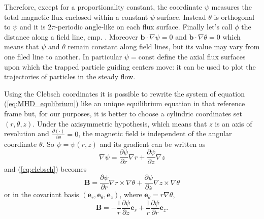 Therefore, except for a proportionality constant, the coordinate $\psi$ measures the total magnetic flux enclosed within a constant $\psi$ surface. Instead $\theta$ is orthogonal to $\psi$ and it is $2\pi$-periodic angle-like on each flux surface. Finally let's call $\phi$ the distance along a field line, cmp. \cite[p. 1617]{magnetic_mirror}. Moreover $\mathbf{b}\cdot\nabla\psi=0$ and $\mathbf{b}\cdot\nabla\theta=0$ which means that $\psi$ and $\theta$ remain constant along field lines, but its value may vary from one filed line to another. In particular $\psi=\mathrm{const}$ define the axial flux surfaces upon which the trapped particle guiding centers move: it can be used to plot the trajectories of particles in the steady flow.
\medskip

Using the Clebsch coordinates it is possible to rewrite the system of equation (\ref{eq:MHD_equlibrium}) like an unique equilibrium equation in that reference frame but, for our purposes, it is better to choose a cylindric coordinates set $(r,\theta, z)$. Under the axisymmetric hypothesis, which means that $z$ is an axis of revolution and $\frac{\partial(\cdot)}{\partial \theta}=0$, the magnetic field is independent of the angular coordinate $\theta$. So $\psi=\psi(r,z)$ and its gradient can be written as
\begin{equation}
  \nabla\psi=\frac{\partial\psi}{\partial r}\nabla r+\frac{\partial\psi}{\partial z}\nabla z
\end{equation}
and (\ref{eq:clebsch}) becomes
\begin{equation}
  \mathbf{B}= \frac{\partial\psi}{\partial r}\nabla r \times\nabla\theta+\frac{\partial\psi}{\partial z}\nabla z \times\nabla\theta
\end{equation}
or in the covariant basis $(\mathbf{e}_r,\mathbf{e}_\theta,\mathbf{e}_z)$, where $\mathbf{e}_\theta=r\nabla\theta$,
\begin{equation}\label{eq:covariantB}
 \mathbf{B}=-\frac{1}{r}\frac{\partial\psi}{\partial z}\mathbf{e}_r+\frac{1}{r}\frac{\partial\psi}{\partial r}\mathbf{e}_z.
\end{equation}

